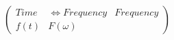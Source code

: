 \documentclass[preview]{standalone}
\begin{document}
\begin{align*}
\left( \begin{array}{cc} Time & \Longleftrightarrow Frequency & Frequency \\ f(t) & F(\omega) \end{array} \right)
\end{align*}
\end{document}
